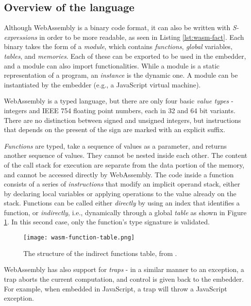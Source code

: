 \subsection{Overview of the language}

Although WebAssembly is a binary code format, it can also be written with \textit{S-expressions}
in order to be more readable, as seen in Listing \ref{lst:wasm-fact}.
Each binary takes the form of a \textit{module}, which contains \textit{functions}, \textit{global} variables,
\textit{tables}, and \textit{memories}. Each of these can be exported to be used in the embedder, and a module can also import functionalities.
While a module is a static representation of a program, an \textit{instance} is the dynamic one.
A module can be instantiated by the embedder (e.g., a JavaScript virtual machine).

WebAssembly is a typed language, but there are only four basic \textit{value types} - integers and IEEE 754 floating
point numbers, each in 32 and 64 bit variants. There are no distinction between signed and unsigned integers,
but instructions that depends on the present of the sign are marked with an explicit suffix.

\textit{Functions} are typed, take a sequence of values as a parameter, and returns another sequence of values.
They cannot be nested inside each other. The content of the call stack for execution are separate from the data
portion of the memory, and cannot be accessed directly by WebAssembly.
The code inside a function consists of a series of \textit{instructions} that modify an implicit operand stack,
either by declaring local variables or applying operations to the value already on the stack.
Functions can be called either \textit{directly} by using an index that identifies a function, or \textit{indirectly},
i.e., dynamically through a global \textit{table} as shown in Figure \ref{fig:indirect-function-table-structure}.
In this second case, only the function's type signature is validated.

\begin{figure}[ht]
  \centering
  \texttt{[image: wasm-function-table.png]}
  \caption{The structure of the indirect functions table, from \cite{binary-security-wasm-2020}.}
  \label{fig:indirect-function-table-structure}
\end{figure}

WebAssembly has also support for \textit{traps} - in a similar manner to an exception, a trap aborts the current
computation, and control is given back to the embedder. For example, when embedded in JavaScript, a trap will
throw a JavaScript exception.


